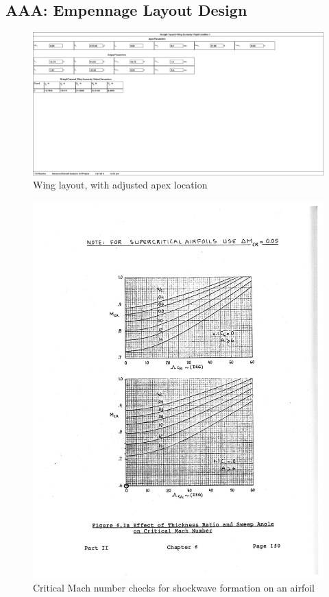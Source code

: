 \documentclass[conf]{new-aiaa}
\begin{document}
\subsection{AAA: Empennage Layout Design}

\begin{figure}[H]
    \includegraphics[width=\textwidth]{Report3Printouts/changedwing.png}
    \caption{Wing layout, with adjusted apex location}
    \label{fig:changedwing}
\end{figure}

\begin{figure}[H]
    \includegraphics[width=\textwidth]{plots/Mcr_check.png}
    \caption{Critical Mach number checks for shockwave formation on an airfoil}
    \label{fig:critical_mach_check}
\end{figure}
\end{document}
